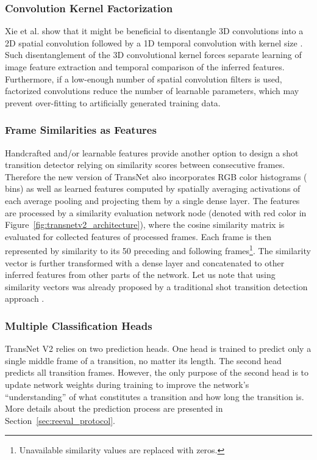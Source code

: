 \documentclass[sigconf]{acmart}
\begin{document}
\subsubsection{Convolution Kernel Factorization}
Xie et al. \cite{Xie_2018_ECCV} show that it might be beneficial to disentangle 3D  convolutions into a 2D  spatial convolution followed by a 1D temporal convolution with kernel size . Such disentanglement of the 3D convolutional kernel forces separate learning of image feature extraction and temporal comparison of the inferred features. Furthermore, if a low-enough number of spatial convolution filters is used, factorized convolutions reduce the number of learnable parameters, which may prevent over-fitting to artificially generated training data.


\subsubsection{Frame Similarities as Features}
Handcrafted and/or learnable features provide another option to design a shot transition detector relying on similarity scores between consecutive frames.
Therefore the new version of TransNet also incorporates RGB color histograms ( bins) as well as learned features computed by spatially averaging activations of each average pooling and projecting them by a single dense layer. The features are processed by a similarity evaluation network node (denoted with red color in Figure~\ref{fig:transnetv2_architecture}), where the cosine similarity matrix is evaluated for collected features of processed frames. Each frame is then represented by similarity to its 50 preceding and following frames\footnote{Unavailable similarity values are replaced with zeros.}. The similarity vector is further transformed with a dense layer and concatenated to other inferred features from other parts of the network. Let us note that using similarity vectors was already proposed by a traditional shot transition detection approach \cite{CHASANIS_SVMonSimilarityVectors}.

\subsubsection{Multiple Classification Heads} 
TransNet V2 relies on two prediction heads. One head is trained to predict only a single middle frame of a transition, no matter its length. The second head predicts all transition frames. However, the only purpose of the second head is to update network weights during training to improve the network's ``understanding'' of what constitutes a transition and how long the transition is. More details about the prediction process are presented in Section~\ref{sec:reeval_protocol}.
\end{document}
